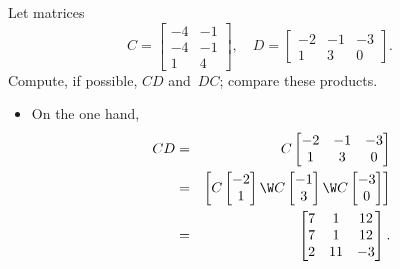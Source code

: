 \begin{example} 
Let matrices
\begin{equation*}
C=\begin{bmatrix} -4 & -1\\ -4 & -1\\ 1 & 4 \end{bmatrix},\quad
D=\begin{bmatrix} -2 & -1 & -3\\ 1 & 3 & 0 \end{bmatrix}.
\end{equation*}
Compute, if possible, \(CD\) and~\(DC\); compare these products.
\begin{solution} 
\begin{itemize}
\item On the one hand,
\begin{eqnarray*}
CD&=&C\begin{bmatrix} -2 & -1 & -3\\ 1 & 3 & 0 \end{bmatrix}
\\&=&\begin{bmatrix} C\begin{bmatrix} -2\\1 \end{bmatrix}\W
C\begin{bmatrix} -1\\3 \end{bmatrix}\W
C\begin{bmatrix} -3\\0 \end{bmatrix}
 \end{bmatrix}
\\&=&\begin{bmatrix} 7&1&12\\7&1&12\\2&11&-3 \end{bmatrix}.
\end{eqnarray*}


\end{itemize}
\end{solution}
\end{example}
